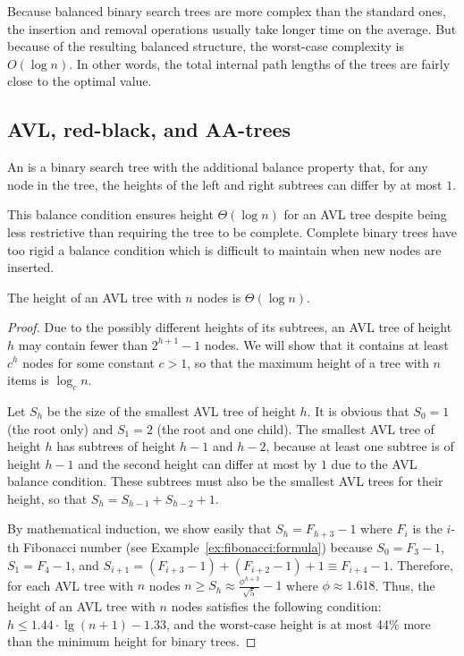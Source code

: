 Because balanced binary search trees are more complex than the standard
ones, the insertion and removal operations usually take
longer time on the average. But because of the resulting balanced structure,
the worst-case complexity is $O(\log n)$. In
other words, the total internal path lengths of the trees are fairly close to
the optimal value.

\subsection{AVL, red-black, and AA-trees}
\label{ss:avl}

\begin{Definition}
An  is a binary search tree 
with the additional
balance property that, for any node in the tree, the heights of
the left and right subtrees can differ by at most $1$. 
\end{Definition}

This balance condition ensures height $\Theta(\log n)$
for an AVL tree despite being less restrictive than requiring the tree to be 
complete. Complete binary trees have too rigid  a balance condition 
which is difficult to maintain when new nodes are inserted.

\begin{Lemma}
The height of an AVL tree with $n$ nodes is $\Theta(\log n)$.
\end{Lemma}
\begin{proof}

Due to the possibly different heights of its subtrees, an
AVL tree of height $h$ may contain fewer than $2^{h+1}-1$ nodes.
We will show that it contains at least $c^{h}$ nodes for some constant $c>1$, 
so that the maximum height of a tree with $n$ items is $\log_{c}n$.

Let $S_{h}$ be the size of the smallest AVL tree of height $h$. It is
obvious that $S_{0}=1$ (the root only) and $S_{1}=2$ (the root and one
child). The smallest AVL tree of height $h$ has subtrees of height $h-1$
and $h-2$, because at least one subtree is of height $h-1$ and the second
height can differ at most by $1$ due to the AVL balance condition. These
subtrees must also be the smallest AVL trees for their height, so that $S_{h}=
S_{h-1}+S_{h-2}+1$. 

By mathematical induction, we show easily that
$S_{h}=F_{h+3}-1$  where $F_{i}$ is the $i$-th Fibonacci number
(see Example~\ref{ex:fibonacci:formula})
because $S_{0} = F_{3}-1$, $S_{1} = F_{4}-1$, and $S_{i+1}=
(F_{i+3}-1)+(F_{i+2}-1)+1 \equiv F_{i+4}-1$. Therefore, 
for each AVL tree with $n$ nodes
\(
n \ge S_{h} \approx \frac{\phi^{h+3}}{\sqrt{5}} - 1
\)
where $\phi \approx 1.618$. Thus, 
the height of an AVL tree with $n$ nodes satisfies
the following condition:
\(
h \le 1.44 \cdot \lg (n+1) - 1.33
\),
and the worst-case height is at most 44\% more than the minimum height for
binary trees. 
\end{proof}

